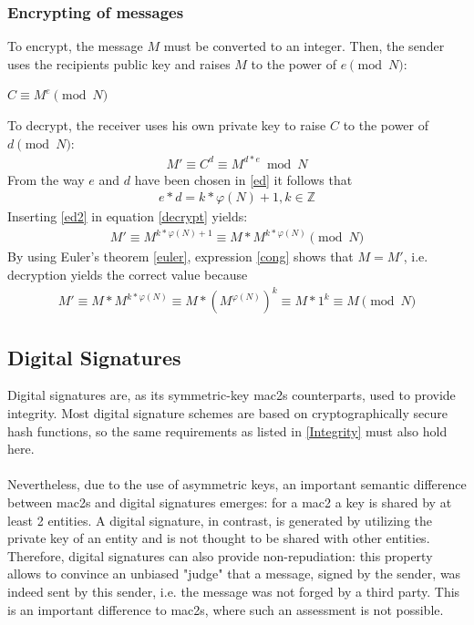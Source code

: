 \subsubsection{Encrypting of messages}

To encrypt, the message $M$ must be converted to an integer. Then, the sender uses the recipients public key and raises $M$ to the power of $e \pmod N$:
\begin{center}
 $C \equiv M^e \pmod N$
\end{center}
To decrypt, the receiver uses his own private key to raise $C$ to the power of $d \pmod N$:
\begin{align}\label{decrypt}
 M' \equiv C^d \equiv M^{d*e} \bmod N
\end{align}
From the way $e$ and $d$ have been chosen in \ref{ed} it follows that 
\begin{align}\label{ed2}
 e*d = k * \varphi(N) + 1, k \in \mathbb{Z} 
\end{align}
Inserting \ref{ed2} in equation \ref{decrypt} yields:
\begin{align}\label{cong}
  M' \equiv M^{k * \varphi(N) + 1} \equiv M* M^{k * \varphi(N)} \pmod N
\end{align}
By using Euler's theorem \ref{euler}, expression \ref{cong} shows that $M=M'$, i.e. decryption yields the correct value because
\begin{align*}
 M' \equiv M* M^{k * \varphi(N)} \equiv M* (M^{ \varphi(N)})^k \equiv M * 1^k \equiv M \pmod N
\end{align*} 

\subsection{Digital Signatures}\label{digitalSignatures}

Digital signatures are, as its symmetric-key \glspl{mac2} counterparts, used to provide integrity. Most digital signature schemes are based on
cryptographically secure hash functions, so the same requirements as listed in \ref{Integrity} must also hold here.
\\
\\
Nevertheless, due to the use of asymmetric keys, an important semantic difference between \glspl{mac2} and digital signatures emerges: for a \gls{mac2} 
a key is shared by at least 2 entities. A digital signature, in contrast, is generated by utilizing the private key of an entity and is not thought to be shared with
other entities. Therefore, digital signatures can also provide non-repudiation:
this property allows to convince an unbiased "judge" that a message, signed by the sender, was indeed sent by this sender, i.e. the message was not
forged by a third party. This is an important difference to \glspl{mac2}, where such an assessment is not possible.

